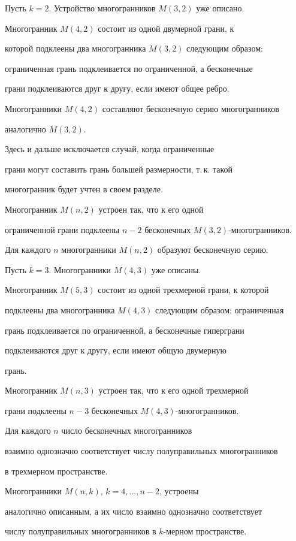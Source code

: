 \begin{pf}
 


Пусть $k=2$. Устройство многогранников $M(3,2)$ уже описано. 


Многогранник $M(4,2)$ состоит из одной двумерной грани, к 


которой подклеены два многогранника $M(3,2)$ следующим образом:  


ограниченная грань подклеивается по ограниченной, а бесконечные 


грани подклеиваются друг к другу, если имеют общее ребро. 


Многогранники $M(4,2)$ составляют бесконечную серию многогранников 


аналогично $M(3,2)$. 


 


Здесь и дальше исключается случай, когда ограниченные 


грани могут составить грань большей размерности, т.\,к. такой 


многогранник будет учтен в своем разделе. 


Многогранник $M(n,2)$ устроен так, что к его одной 


ограниченной грани подклеены $n-2$ бесконечных $M(3,2)$-многогранников. 


Для каждого $n$ многогранники $M(n,2)$ образуют бесконечную серию. 


 


Пусть $k=3$. Многогранники $M(4,3)$ уже описаны. 


Многогранник $M(5,3)$ состоит из одной трехмерной грани, к которой 


подклеены два многогранника $M(4,3)$ следующим образом: ограниченная 


грань подклеивается по ограниченной, а бесконечные гиперграни 


подклеиваются друг к другу, если имеют общую двумерную 


грань. 


Многогранник $M(n,3)$ устроен так, что к его одной трехмерной 


грани подклеены $n-3$ бесконечных $M(4,3)$-многогранников. 


 


Для каждого $n$ число бесконечных многогранников  


взаимно однозначно соответствует числу полуправильных многогранников 


в трехмерном пространстве. 


 


Многогранники $M(n,k)$, $k=4,\dotsc,n-2$, устроены  


аналогично описанным, а их число взаимно однозначно соответствует  


числу полуправильных многогранников в $k$-мерном пространстве. 


\end{pf} 


